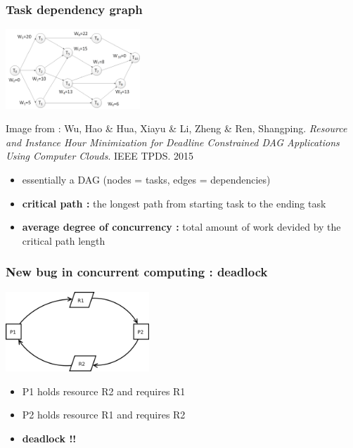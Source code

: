 \begin{frame}[containsverbatim]
\frametitle{Task dependency graph}
\begin{center}
        {\includegraphics[height=3cm]{Day0/images/dependency.png}}
\end{center}
{\tiny Image from : Wu, Hao \& Hua, Xiayu \& Li, Zheng \& Ren, Shangping. \textit{Resource and Instance Hour Minimization for Deadline Constrained DAG Applications Using Computer Clouds}. IEEE TPDS. 2015}
\begin{itemize}
	\item{essentially a DAG (nodes = tasks, edges = dependencies)}
	\item{\textbf{critical path :} the longest path from starting task to the ending task}
	\item{\textbf{average degree of concurrency :} total amount of work devided by the critical path length}
\end{itemize}
\end{frame}




\begin{frame}[containsverbatim]
\frametitle{New bug in concurrent computing : deadlock}
\begin{center}
        {\includegraphics[height=3cm]{Day0/images/deadlock.png}}
\end{center}
\begin{itemize}
	\item{P1 holds resource R2 and requires R1}
	\item{P2 holds resource R1 and requires R2}
	\item{\textbf{deadlock !!}}
\end{itemize}
\end{frame}


